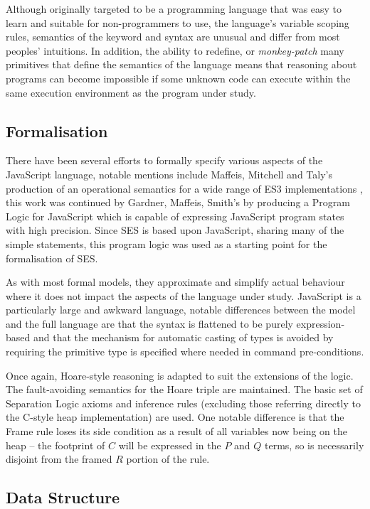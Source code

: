 \documentclass[a4paper,notitlepage]{report}
\begin{document}
  Although originally targeted to be a programming language that was easy to
  learn and suitable for non-programmers to use, the language's variable scoping
  rules, semantics of the  keyword and  syntax are unusual
  and differ from most peoples' intuitions. In addition, the ability to
  redefine, or \emph{monkey-patch} many primitives that define the semantics of
  the language means that reasoning about programs can become impossible if
  some unknown code can execute within the same execution environment as the
  program under study.

  \subsection{Formalisation}
  There have been several efforts to formally specify various aspects of the
  JavaScript language, notable mentions include Maffeis, Mitchell and Taly's
  production of an operational semantics for a wide range of ES3
  implementations \cite{maffeis-jsopsem}, this work was continued by
  Gardner, Maffeis, Smith's \cite{gms-popl} by producing a
  Program Logic for JavaScript which is capable of expressing JavaScript
  program states with high precision. Since SES is based upon JavaScript,
  sharing many of the simple statements, this program logic was used as a
  starting point for the formalisation of SES.

  As with most formal models, they approximate and simplify actual behaviour
  where it does not impact the aspects of the language under study. JavaScript
  is a particularly large and awkward language, notable differences between the
  model and the full language are that the syntax is flattened to be purely
  expression-based and that the mechanism for automatic casting of types is
  avoided by requiring the primitive type is specified where needed in command
  pre-conditions.

  Once again, Hoare-style reasoning is adapted to suit the extensions of the
  logic. The fault-avoiding semantics for the Hoare triple are maintained. The
  basic set of Separation Logic axioms and inference rules (excluding those
  referring directly to the C-style heap implementation) are used. One notable
  difference is that the Frame rule loses its side condition as a result of all
  variables now being on the heap -- the footprint of $C$ will be expressed in
  the $P$ and $Q$ terms, so is necessarily disjoint from the framed $R$ portion of
  the rule.

  \subsection{Data Structure}
\end{document}
